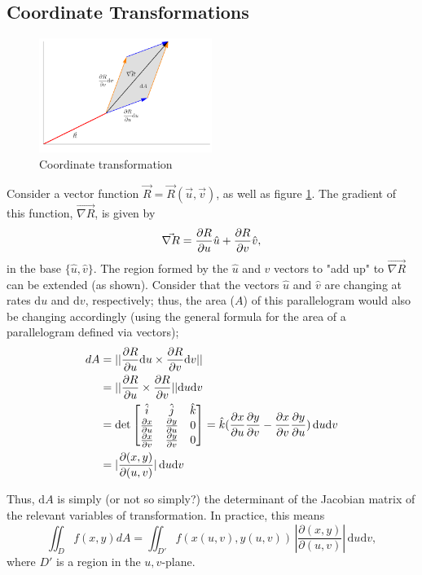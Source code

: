 \documentclass[12pt]{article}
\begin{document}
{\subsection{Coordinate Transformations}

\begin{figure}[!ht]
    \centering
    \includegraphics[width=0.5\textwidth]{./misc/transformationofvariables.png}
    \caption{Coordinate transformation}
    \label{fig:coordinate_transformations}
\end{figure}

Consider a vector function $\vec{R} = \vec{R}(\vec{u}, \vec{v})$, as well as figure \ref{fig:coordinate_transformations}. The gradient of this function, $\vec{\nabla R}$, is given by \[\vec{\nabla R} = \frac{\partial R}{\partial u} \hat{u} + \frac{\partial R}{\partial v} \hat{v},\] in the base $\{\hat{u}, \hat{v}\}$. The region formed by the $\hat{u}$ and $\hat{v}$ vectors to "add up" to $\vec{\nabla R}$ can be extended (as shown). Consider that the vectors $\hat{u}$ and $\hat{v}$ are changing at rates $\text{d}u$ and $\text{d}v$, respectively; thus, the area ($A$) of this parallelogram would also be changing accordingly (using the general formula for the area of a parallelogram defined via vectors); \begin{align*}
    dA &= ||\frac{\partial R}{\partial u}\text{d}u  \times \frac{\partial R}{\partial v}\text{d}v||\\
    &=  ||\frac{\partial R}{\partial u} \times \frac{\partial R}{\partial v}||\text{d}u \text{d}v\\
    &= \text{det}\begin{bmatrix}
        \hat{i} & \hat{j} & \hat{k}\\
        \frac{\partial x}{\partial u} & \frac{\partial y}{\partial u} & 0\\
        \frac{\partial x}{\partial v} & \frac{\partial y}{\partial v} & 0\\
    \end{bmatrix}= \hat{k}(\frac{\partial x}{\partial u} \frac{\partial y}{\partial v} - \frac{\partial x}{\partial v} \frac{\partial y}{\partial u})\,\text{d}u \text{d}v\\
    &= |\frac{\partial(x,y)}{\partial(u,v)}|\,\text{d}u \text{d}v
\end{align*}

Thus, $\text{d}A$ is simply (or not so simply?) the determinant of the Jacobian matrix of the relevant variables of transformation. In practice, this means \[\iint_D f(x,y) dA = \iint_{D'} f(x(u,v), y(u,v))\, |\frac{\partial(x,y)}{\partial(u,v)}|\,\text{d}u \text{d}v,\] where $D'$ is a region in the $u,v$-plane.

}
\end{document}
